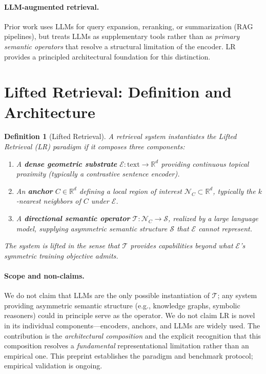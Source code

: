 \documentclass[twocolumn]{article}
\newcommand{\lr}{\textsc{LR}}
\newtheorem{definition}{Definition}
\begin{document}
\paragraph{LLM-augmented retrieval.}
Prior work uses LLMs for query expansion, reranking, or summarization
(RAG pipelines), but treats LLMs as supplementary tools rather than as
\emph{primary semantic operators} that resolve a structural limitation
of the encoder.
\lr{} provides a principled architectural foundation for this distinction.

\section{Lifted Retrieval: Definition and Architecture}
\label{sec:lr}

\begin{definition}[Lifted Retrieval]
\label{def:lr}
A retrieval system instantiates the \emph{Lifted Retrieval} (\lr{})
paradigm if it composes three components:
\begin{enumerate}[leftmargin=*,itemsep=1pt]
\item A \textbf{dense geometric substrate}
  $\mathcal{E}: \text{text} \to \mathbb{R}^d$
  providing continuous topical proximity (typically a contrastive
  sentence encoder).
\item An \textbf{anchor} $C \in \mathbb{R}^d$ defining a local region
  of interest $\mathcal{N}_C \subset \mathbb{R}^d$, typically the
  $k$-nearest neighbors of $C$ under $\mathcal{E}$.
\item A \textbf{directional semantic operator}
  $\mathcal{T}: \mathcal{N}_C \to \mathcal{S}$, realized by a large
  language model, supplying asymmetric semantic structure $\mathcal{S}$
  that $\mathcal{E}$ cannot represent.
\end{enumerate}
The system is \emph{lifted} in the sense that $\mathcal{T}$ provides
capabilities beyond what $\mathcal{E}$'s symmetric training objective
admits.
\end{definition}

\paragraph{Scope and non-claims.}
We do not claim that LLMs are the only possible instantiation of
$\mathcal{T}$; any system providing asymmetric semantic structure
(e.g., knowledge graphs, symbolic reasoners) could in principle
serve as the operator.
We do not claim \lr{} is novel in its individual components---encoders,
anchors, and LLMs are widely used.
The contribution is the \emph{architectural composition} and the
explicit recognition that this composition resolves a \emph{fundamental}
representational limitation rather than an empirical one.
This preprint establishes the paradigm and benchmark protocol;
empirical validation is ongoing.
\end{document}
